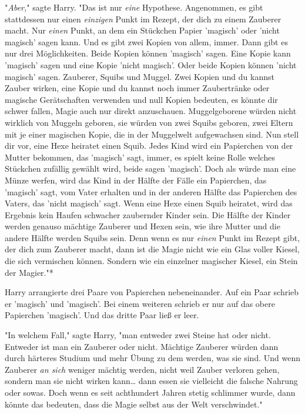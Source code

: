 {"\emph{Aber,}" sagte Harry. "Das ist nur \emph{eine} Hypothese. Angenommen, es gibt stattdessen nur einen \emph{einzigen} Punkt im Rezept, der dich zu einem Zauberer macht. Nur \emph{einen} Punkt, an dem ein Stückchen Papier 'magisch' oder 'nicht magisch' sagen kann. Und es gibt zwei Kopien von allem, immer. Dann gibt es nur drei Möglichkeiten. Beide Kopien können 'magisch' sagen. Eine Kopie kann 'magisch' sagen und eine Kopie 'nicht magisch'. Oder beide Kopien können 'nicht magisch' sagen. Zauberer, Squibs und Muggel. Zwei Kopien und du kannst Zauber wirken, eine Kopie und du kannst noch immer Zaubertränke oder magische Gerätschaften verwenden und null Kopien bedeuten, es könnte dir schwer fallen, Magie auch nur direkt anzuschauen. Muggelgeborene würden nicht wirklich von Muggeln geboren, sie würden von zwei Squibs geboren, zwei Eltern mit je einer magischen Kopie, die in der Muggelwelt aufgewachsen sind. Nun stell dir vor, eine Hexe heiratet einen Squib. Jedes Kind wird ein Papierchen von der Mutter bekommen, das 'magisch' sagt, immer, es spielt keine Rolle welches Stückchen zufällig gewählt wird, beide sagen 'magisch'. Doch als würde man eine Münze werfen, wird das Kind in der Hälfte der Fälle ein Papierchen, das 'magisch' sagt, vom Vater erhalten und in der anderen Hälfte das Papierchen des Vaters, das 'nicht magisch' sagt. Wenn eine Hexe einen Squib heiratet, wird das Ergebnis kein Haufen schwacher zaubernder Kinder sein. Die Hälfte der Kinder werden genauso mächtige Zauberer und Hexen sein, wie ihre Mutter und die andere Hälfte werden Squibs sein. Denn wenn es nur \emph{einen} Punkt im Rezept gibt, der dich zum Zauberer macht, dann ist die Magie nicht wie ein Glas voller Kiesel, die sich vermischen können. Sondern wie ein einzelner magischer Kiesel, ein Stein der Magier."*

Harry arrangierte drei Paare von Papierchen nebeneinander. Auf ein Paar schrieb er 'magisch' und 'magisch'. Bei einem weiteren schrieb er nur auf das obere Papierchen 'magisch'. Und das dritte Paar ließ er leer.

"In welchem Fall," sagte Harry, "man entweder zwei Steine hat oder nicht. Entweder ist man ein Zauberer oder nicht. Mächtige Zauberer würden dann durch härteres Studium und mehr Übung zu dem werden, was sie sind. Und wenn Zauberer \emph{an sich} weniger mächtig werden, nicht weil Zauber verloren gehen, sondern man sie nicht wirken kann… dann essen sie vielleicht die falsche Nahrung oder sowas. Doch wenn es seit achthundert Jahren stetig schlimmer wurde, dann könnte das bedeuten, dass die Magie selbst aus der Welt verschwindet."

}
